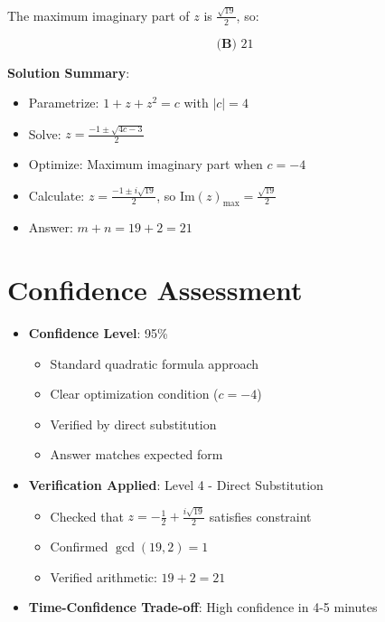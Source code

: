 \documentclass[11pt]{article}
\begin{document}
The maximum imaginary part of $z$ is $\frac{\sqrt{19}}{2}$, so:

\[\boxed{\textbf{(B) } 21}\]

\textbf{Solution Summary}:
\begin{itemize}
    \item Parametrize: $1+z+z^2 = c$ with $|c| = 4$
    \item Solve: $z = \frac{-1 \pm \sqrt{4c-3}}{2}$
    \item Optimize: Maximum imaginary part when $c = -4$
    \item Calculate: $z = \frac{-1 \pm i\sqrt{19}}{2}$, so $\text{Im}(z)_{\max} = \frac{\sqrt{19}}{2}$
    \item Answer: $m + n = 19 + 2 = 21$
\end{itemize}

\section*{Confidence Assessment}
\begin{itemize}[leftmargin=*]
    \item \textbf{Confidence Level}: 95\%
    \begin{itemize}
        \item Standard quadratic formula approach
        \item Clear optimization condition ($c = -4$)
        \item Verified by direct substitution
        \item Answer matches expected form
    \end{itemize}
    \item \textbf{Verification Applied}: Level 4 - Direct Substitution
    \begin{itemize}
        \item Checked that $z = -\frac{1}{2} + \frac{i\sqrt{19}}{2}$ satisfies constraint
        \item Confirmed $\gcd(19, 2) = 1$
        \item Verified arithmetic: $19 + 2 = 21$
    \end{itemize}
    \item \textbf{Time-Confidence Trade-off}: High confidence in 4-5 minutes
\end{itemize}
\end{document}
